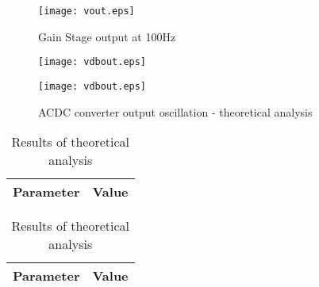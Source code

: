 \begin{figure}[h] \centering
\texttt{[image: vout.eps]}
\vspace{-5mm}
\caption{Gain Stage output at 100Hz}
\label{fig:vout}
\end{figure}

\begin{figure}[h] \centering
  \begin{minipage}{.45\textwidth}
    \texttt{[image: vdbout.eps]}
    \caption{ACDC converter output oscillation - theoretical analysis}
    \label{fig:vdbout}
  \end{minipage}%
    \hspace{2 mm}
  \begin{minipage}{.45\textwidth}
  \centering
    \texttt{[image: vdbout.eps]}
    \caption{ACDC converter output oscillation - theoretical analysis}
    \label{fig:compvdbout}
      \end{minipage}%
\end{figure}

\begin{table}[!htb]
  \begin{minipage}{.5\linewidth}
     \centering
  \begin{tabular}{|c|c|}
    \hline    
    {\bf Parameter} & {\bf Value} \\ \hline
    
    
 \end{tabular}
 \caption{Results of simulation analysis}
 \label{tab:z}
  \end{minipage}
    \hspace{2 mm}
    \begin{minipage}{.5\linewidth}
      \centering
        \begin{tabular}{|c|c|}
    \hline    
    {\bf Parameter} & {\bf Value} \\ \hline
     
    
 \end{tabular}
        \caption{Results of theoretical analysis}
        \label{tab:compz}
    \end{minipage} 
\end{table}


\newpage
